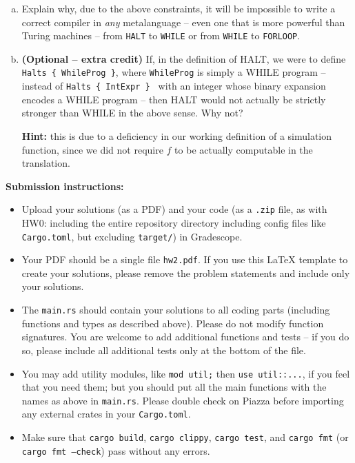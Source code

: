 \documentclass{article}
\theoremstyle{plain}
\begin{document}
\begin{enumerate}
\begin{enumerate}[(a)]
\item
Explain why, due to the above constraints, it will be impossible to write a correct compiler in \emph{any} metalanguage -- even one that is more powerful than Turing machines -- from \texttt{HALT} to \texttt{WHILE} or from \texttt{WHILE} to \texttt{FORLOOP}.

\item \textbf{(Optional -- extra credit)}
If, in the definition of HALT,
we were to define \texttt{Halts \{ WhileProg \}}, where \texttt{WhileProg} is simply
a WHILE program -- instead of \texttt{Halts \{ IntExpr \} } with an integer whose binary expansion encodes a WHILE program -- then HALT would not actually
be strictly stronger than WHILE in the above sense.
Why not?

\textbf{Hint:} this is due to a deficiency in our working definition of a simulation function, since we did not require $f$ to be actually computable in the translation.

\end{enumerate}


\end{enumerate}

\newpage

\noindent
\textbf{Submission instructions:}
\begin{itemize}
\item Upload your solutions (as a PDF) and your code (as a \texttt{.zip} file, as with HW0: including the entire repository directory including config files like \texttt{Cargo.toml}, but excluding \texttt{target/}) in Gradescope.

\item Your PDF should be a single file \texttt{hw2.pdf}. If you use this LaTeX template to create your solutions, please remove the problem statements and include only your solutions.

\item The \texttt{main.rs} should contain your solutions to all coding parts (including functions and types as described above). Please do not modify function signatures. You are welcome to add additional functions and tests -- if you do so, please include all additional tests only at the bottom of the file.

\item You may add utility modules, like \texttt{mod util;} then \texttt{use util::...}, if you feel that you need them; but you should put all the main functions with the names as above in \texttt{main.rs}. Please double check on Piazza before importing any external crates in your \texttt{Cargo.toml}.

\item Make sure that \texttt{cargo build}, \texttt{cargo clippy}, \texttt{cargo test}, and \texttt{cargo fmt} (or \texttt{cargo fmt --check}) pass without any errors.
\end{itemize}
\end{document}
